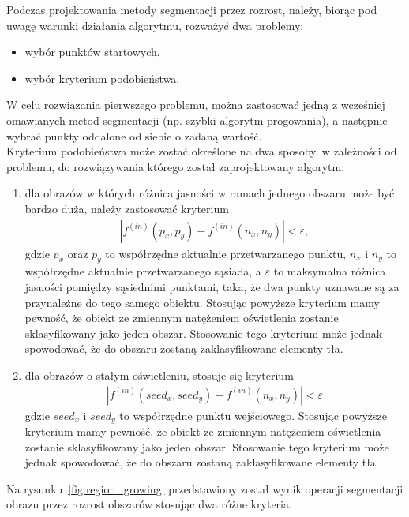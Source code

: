 Podczas projektowania metody segmentacji przez rozrost, należy, biorąc pod uwagę warunki działania algorytmu, rozważyć dwa problemy:
\begin{itemize}
  \item wybór punktów startowych,
  \item wybór kryterium podobieństwa.
\end{itemize}
W celu rozwiązania pierwszego problemu, można zastosować jedną z wcześniej omawianych metod segmentacji (np. szybki algorytm progowania), a następnie wybrać punkty oddalone od siebie o zadaną wartość. \\
Kryterium podobieństwa może zostać określone na dwa sposoby, w zależności od problemu, do rozwiązywania którego został zaprojektowany algorytm:
\begin{enumerate}
  \item dla obrazów w których różnica jasności w ramach jednego obszaru może być bardzo duża, należy zastosować kryterium 
    \begin{gather*}
      |f^{(in)}(p_x, p_y) - f^{(in)}(n_x, n_y)| < \varepsilon,
    \end{gather*}
    gdzie $p_x$ oraz $p_y$ to współrzędne aktualnie przetwarzanego punktu, $n_x$ i $n_y$ to współrzędne aktualnie przetwarzanego sąsiada, a $\varepsilon$ to maksymalna różnica jasności pomiędzy sąsiednimi punktami, taka, że dwa punkty uznawane są za przynależne do tego samego obiektu. Stosując powyższe kryterium mamy pewność, że obiekt ze zmiennym natężeniem oświetlenia zostanie sklasyfikowany jako jeden obszar. Stosowanie tego kryterium może jednak spowodować, że do obszaru zostaną zaklasyfikowane elementy tła.
    \item dla obrazów o stałym oświetleniu, stosuje się kryterium
      \begin{gather*}
        |f^{(in)}(seed_x, seed_y) - f^{(in)}(n_x, n_y)| < \varepsilon
      \end{gather*}
      gdzie $seed_x$ i $seed_y$ to współrzędne punktu wejściowego. Stosując powyższe kryterium mamy pewność, że obiekt ze zmiennym natężeniem oświetlenia zostanie sklasyfikowany jako jeden obszar. Stosowanie tego kryterium może jednak spowodować, że do obszaru zostaną zaklasyfikowane elementy tła.
\end{enumerate}
Na rysunku~\ref{fig:region_growing} przedstawiony został wynik operacji segmentacji obrazu przez rozrost obszarów stosując dwa różne kryteria.
